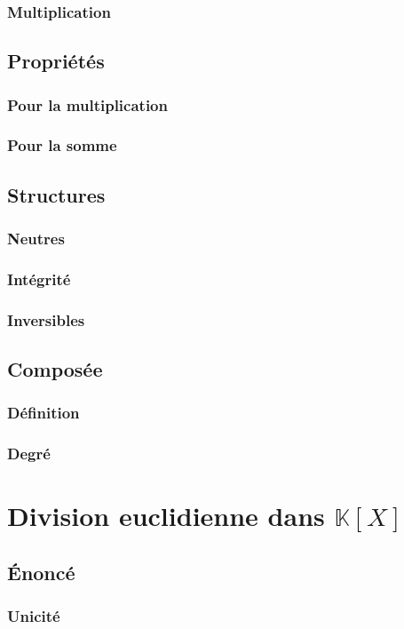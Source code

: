 \documentclass[12pt,a4paper,french]{book}
\begin{document}
			\subsubsection{Multiplication}
		\subsection{Propriétés}
			\subsubsection{Pour la multiplication}
			\subsubsection{Pour la somme}
		\subsection{Structures}
			\subsubsection{Neutres}
			\subsubsection{Intégrité}
			\subsubsection{Inversibles}
		\subsection{Composée}
			\subsubsection{Définition}
			\subsubsection{Degré}
	\section{Division euclidienne dans $\mathbb{K}[X]$}
		\subsection{Énoncé}
			\subsubsection{Unicité}
\end{document}
